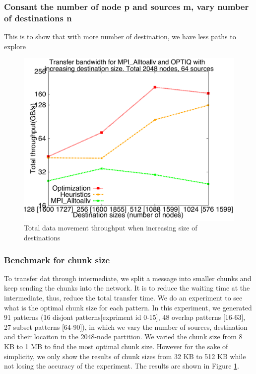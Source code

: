 \subsubsection{Consant the number of node p and sources m, vary number of destinations n}
This is to show that with more number of destination, we have less paths to explore

\begin{figure}[!htb]
\vspace{-0.1in}
\centering
\includegraphics[scale=0.30]{figures/incrsize.pdf}
\vspace{-0.1in}
\caption{Total data movement throughput when increasing size of destinations}
\vspace{-0.1in}
\label{fig:chunksize}
\end{figure}

\subsubsection{Benchmark for chunk size}

To transfer dat through intermediate, we split a message into smaller chunks and keep sending the chunks into the network. It is to reduce the waiting time at the intermediate, thus, reduce the total transfer time. We do an experiment to see what is the optimal chunk size for each pattern. In this experiment, we generated 91 patterns (16 disjont patterns[expriment id 0-15], 48 overlap patterns [16-63], 27 subset patterns [64-90]), in which we vary the number of sources, destination and their locaiton in the 2048-node partition. We varied the chunk size from 8 KB to 1 MB to find the most optimal chunk size. However for the sake of simplicity, we only show the results of chunk sizes from 32 KB to 512 KB while not losing the accuracy of the experiment. The results are shown in Figure \ref{fig:chunksize}.

